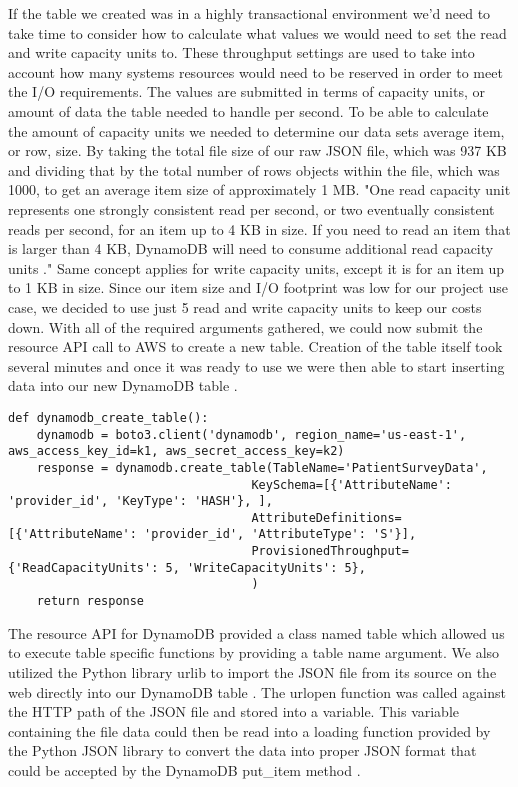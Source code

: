 If the table we created was in a highly transactional environment we'd need to take time to consider how to calculate what values we would need to set the read and write capacity units to. These throughput settings are used to take into account how many systems resources would need to be reserved in order to meet the I/O requirements. The values are submitted in terms of capacity units, or amount of data the table needed to handle per second. To be able to calculate the amount of capacity units we needed to determine our data sets average item, or row, size. By taking the total file size of our raw JSON file, which was 937 KB and dividing that by the total number of rows objects within the file, which was 1000, to get an average item size of approximately 1 MB. "One read capacity unit represents one strongly consistent read per second, or two eventually consistent reads per second, for an item up to 4 KB in size. If you need to read an item that is larger than 4 KB, DynamoDB will need to consume additional read capacity units \cite{hid-sp18-521-dynamodbreadwrite}." Same concept applies for write capacity units, except it is for an item up to 1 KB in size. Since our item size and I/O footprint was low for our project use case, we decided to use just 5 read and write capacity units to keep our costs down. With all of the required arguments gathered, we could now submit the resource API call to AWS to create a new table. Creation of the table itself took several minutes and once it was ready to use we were then able to start inserting data into our new DynamoDB table \cite{hid-sp18-521-dynamodbreadwrite}.  

\begin{verbatim}
def dynamodb_create_table():
    dynamodb = boto3.client('dynamodb', region_name='us-east-1', aws_access_key_id=k1, aws_secret_access_key=k2)
    response = dynamodb.create_table(TableName='PatientSurveyData',
                                  KeySchema=[{'AttributeName': 'provider_id', 'KeyType': 'HASH'}, ],
                                  AttributeDefinitions=[{'AttributeName': 'provider_id', 'AttributeType': 'S'}],
                                  ProvisionedThroughput={'ReadCapacityUnits': 5, 'WriteCapacityUnits': 5},
                                  )
    return response
\end{verbatim}

The resource API for DynamoDB provided a class named table which allowed us to execute table specific functions by providing a table name argument. We also utilized the Python library urlib to import the JSON file from its source on the web directly into our DynamoDB table \cite{hid-sp18-521-urllib}. The urlopen function was called against the HTTP path of the JSON file and stored into a variable. This variable containing the file data could then be read into a loading function provided by the Python JSON library to convert the data into proper JSON format that could be accepted by the DynamoDB put_item method \cite{hid-sp18-521-botodynamodb}.  

